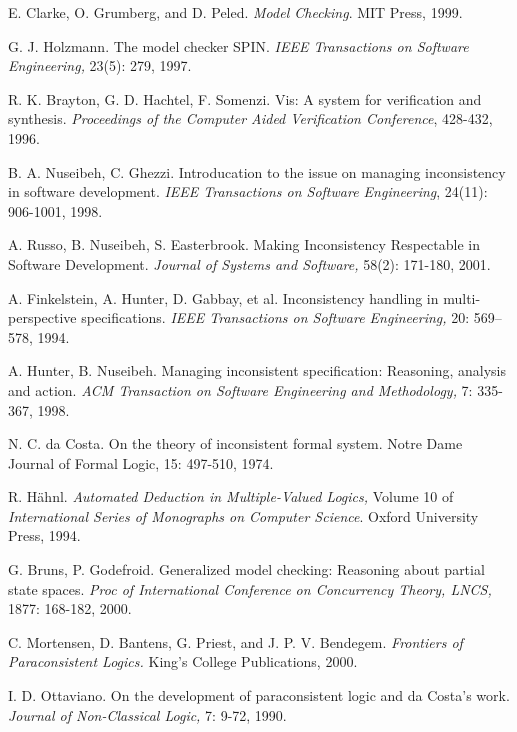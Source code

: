 \documentclass{entcs}
\begin{document}
\begin{thebibliography}{10} \label{biblo}

 E. Clarke, O. Grumberg, and D. Peled. \emph{Model Checking}. MIT Press, 1999.

 G. J. Holzmann. The model checker SPIN. \emph{IEEE Transactions on Software
Engineering,} 23(5): 279, 1997.

  R. K. Brayton, G. D. Hachtel, F. Somenzi. Vis: A system for verification and
synthesis. \emph{Proceedings of the Computer Aided Verification
Conference}, 428-432, 1996.

 B. A. Nuseibeh, C. Ghezzi. Introducation to the
issue on managing inconsistency in software development.
\emph{IEEE Transactions on Software Engineering}, 24(11):
906-1001, 1998.

 A. Russo, B. Nuseibeh, S. Easterbrook.
Making Inconsistency Respectable in Software Development.
\emph{Journal of Systems and Software,} 58(2): 171-180, 2001.

 A. Finkelstein, A. Hunter, D. Gabbay,  et al.
Inconsistency handling in multi-perspective specifications.
\emph{IEEE Transactions on Software Engineering,} 20: 569--578,
1994.

 A. Hunter, B. Nuseibeh. Managing inconsistent specification: Reasoning, analysis
and action. \emph{ACM Transaction on Software Engineering and
Methodology,} 7: 335- 367, 1998.

 N. C. da Costa. On the theory of inconsistent formal system. Notre Dame Journal
of Formal Logic, 15: 497-510, 1974.

 R. H\"{a}hnl. \emph{Automated Deduction in Multiple-Valued
Logics,} Volume 10 of \emph{International Series of Monographs on
Computer Science}. Oxford University Press, 1994.

 G. Bruns, P. Godefroid. Generalized model
checking: Reasoning about partial state spaces. \emph{Proc of
International Conference on Concurrency Theory, LNCS,} 1877:
168-182, 2000.

 C. Mortensen, D. Bantens, G. Priest, and J. P. V.
Bendegem. \emph{Frontiers of Paraconsistent Logics.} King's
College Publications, 2000.

 I. D. Ottaviano. On the development of
paraconsistent logic and da Costa's work. \emph{Journal of
Non-Classical Logic,} 7: 9-72, 1990.


\end{thebibliography}
\end{document}

